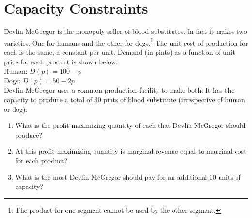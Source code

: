 \documentclass{article}
\begin{document}
\section*{Capacity Constraints}
Devlin-McGregor is the monopoly seller of blood substitutes. In fact it makes two varieties. One for humans and the other for dogs.\footnote{The product for one segment cannot be used by the other segment.} The unit cost of production for each is the same, a constant  per unit. Demand (in pints) as a function of unit price for each product is shown below:
\\
Human: $D(p) = 100-p$
\\
Dogs: $D(p) = 50-2p$
\\
Devlin-McGregor uses a common production facility to make both. It has the capacity to produce a total of 30 pints of blood substitute (irrespective of human or dog).

\begin{enumerate}
\item What is the profit maximizing quantity of each that Devlin-McGregor should produce?
\item At this profit maximizing quantity is marginal revenue equal to marginal cost for each product?
\item What is the most Devlin-McGregor should pay for an additional 10 units of capacity?
\end{enumerate}
\end{document}
